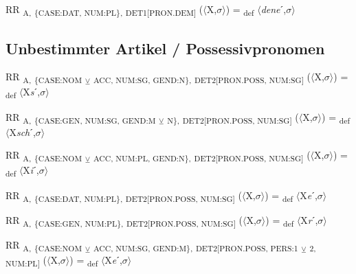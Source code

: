 {\begin{exe}
 RR \textsubscript{A,} \textsubscript{\{CASE:DAT, NUM:PL\},} \textsubscript{DET1[PRON.DEM]} ($\langle$X,$\sigma $$\rangle$) = \textsubscript{def} $\langle$\textit{dene}ˊ,$\sigma $$\rangle$
\end{exe}

\subsection{Unbestimmter Artikel / Possessivpronomen}

\begin{exe}
 RR \textsubscript{A,} \textsubscript{\{CASE:NOM} \textsubscript{${\veebar}$}\textsubscript{ ACC, NUM:SG, GEND:N\},} \textsubscript{DET2[PRON.POSS, NUM:SG]}  ($\langle$X,$\sigma $$\rangle$) = \textsubscript{def} $\langle$X\textit{s}ˊ,$\sigma $$\rangle$
\end{exe}

\begin{exe}
 RR \textsubscript{A,} \textsubscript{\{CASE:GEN, NUM:SG, GEND:M} \textsubscript{${\veebar}$}\textsubscript{ N\},} \textsubscript{DET2[PRON.POSS, NUM:SG]}  ($\langle$X,$\sigma $$\rangle$) = \textsubscript{def} $\langle$X\textit{sch}ˊ,$\sigma $$\rangle$
\end{exe}

\begin{exe}
 RR \textsubscript{A,} \textsubscript{\{CASE:NOM} \textsubscript{${\veebar}$}\textsubscript{ ACC, NUM:PL, GEND:N\},} \textsubscript{DET2[PRON.POSS, NUM:SG]}  ($\langle$X,$\sigma $$\rangle$) = \textsubscript{def} $\langle$X\textit{i}ˊ,$\sigma $$\rangle$
\end{exe}

\begin{exe}
 RR \textsubscript{A,} \textsubscript{\{CASE:DAT, NUM:PL\},} \textsubscript{DET2[PRON.POSS, NUM:SG]}  ($\langle$X,$\sigma $$\rangle$) = \textsubscript{def} $\langle$X\textit{e}ˊ,$\sigma $$\rangle$
\end{exe}

\begin{exe}
 RR \textsubscript{A,} \textsubscript{\{CASE:GEN, NUM:PL\},} \textsubscript{DET2[PRON.POSS, NUM:SG]}  ($\langle$X,$\sigma $$\rangle$) = \textsubscript{def} $\langle$X\textit{r}ˊ,$\sigma $$\rangle$
\end{exe}

\begin{exe}
 RR \textsubscript{A,} \textsubscript{\{CASE:NOM} \textsubscript{${\veebar}$}\textsubscript{ ACC, NUM:SG, GEND:M\},} \textsubscript{DET2[PRON.POSS, PERS:1} \textsubscript{${\veebar}$}\textsubscript{ 2, NUM:PL]}  ($\langle$X,$\sigma $$\rangle$) = \textsubscript{def} $\langle$X\textit{e}ˊ,$\sigma $$\rangle$
\end{exe}

}
